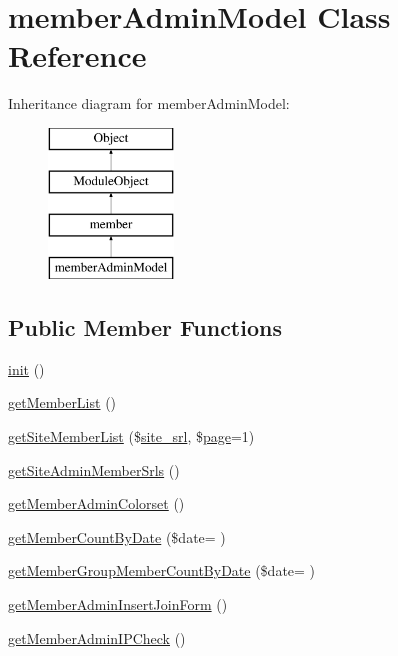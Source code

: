 \hypertarget{classmemberAdminModel}{}\section{member\+Admin\+Model Class Reference}
\label{classmemberAdminModel}
Inheritance diagram for member\+Admin\+Model\+:\begin{figure}[H]
\begin{center}
\leavevmode
\includegraphics[height=4.000000cm]{classmemberAdminModel}
\end{center}
\end{figure}
\subsection*{Public Member Functions}
\begin{DoxyCompactItemize}
\item 
\hyperlink{classmemberAdminModel_a1d4a66fe65aa6670528bddb2c225b9d7}{init} ()
\item 
\hyperlink{classmemberAdminModel_add5844ac2ed9170897363464c759f94f}{get\+Member\+List} ()
\item 
\hyperlink{classmemberAdminModel_a08479489902bfe0940023bc91ee02184}{get\+Site\+Member\+List} (\$\hyperlink{ko_8install_8php_a8b1406b4ad1048041558dce6bfe89004}{site\+\_\+srl}, \$\hyperlink{classpage}{page}=1)
\item 
\hyperlink{classmemberAdminModel_a2ae855f2db9aa8c5fc821a2de9d766e9}{get\+Site\+Admin\+Member\+Srls} ()
\item 
\hyperlink{classmemberAdminModel_a3f52ba31859fdc224dd0ac50495e450c}{get\+Member\+Admin\+Colorset} ()
\item 
\hyperlink{classmemberAdminModel_ab90b32378d82147e766d6755886b322b}{get\+Member\+Count\+By\+Date} (\$date= \textquotesingle{}\textquotesingle{})
\item 
\hyperlink{classmemberAdminModel_a4db855dee9b4624ab0ce224d67ade78e}{get\+Member\+Group\+Member\+Count\+By\+Date} (\$date= \textquotesingle{}\textquotesingle{})
\item 
\hyperlink{classmemberAdminModel_a5cd67d34e825a2afa0fb871bd10aadb9}{get\+Member\+Admin\+Insert\+Join\+Form} ()
\item 
\hyperlink{classmemberAdminModel_a26f6b31630804f56a79156f59c0f7603}{get\+Member\+Admin\+I\+P\+Check} ()
\end{DoxyCompactItemize}
